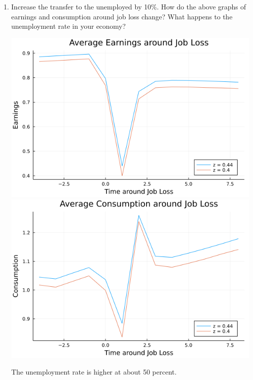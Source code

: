 \documentclass{article}
\begin{document}
\begin{enumerate}
\begin{enumerate}
\item Increase the transfer to the unemployed by 10\%. How do the above graphs of earnings and consumption around job loss change? What happens to the unemployment rate in your economy?

\begin{center}
\includegraphics[scale = 0.5]{figure_3h_1}
\includegraphics[scale = 0.5]{figure_3h_2}
\end{center}

The unemployment rate is higher at about 50 percent.

\end{enumerate}

\end{enumerate}
\end{document}

